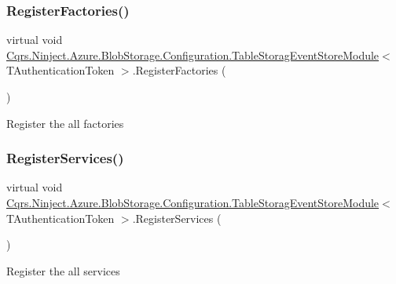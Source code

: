 \subsubsection{\texorpdfstring{Register\+Factories()}{RegisterFactories()}}
{\footnotesize\ttfamily virtual void \hyperlink{classCqrs_1_1Ninject_1_1Azure_1_1BlobStorage_1_1Configuration_1_1TableStoragEventStoreModule}{Cqrs.\+Ninject.\+Azure.\+Blob\+Storage.\+Configuration.\+Table\+Storag\+Event\+Store\+Module}$<$ T\+Authentication\+Token $>$.Register\+Factories (\begin{DoxyParamCaption}{ }\end{DoxyParamCaption})\hspace{0.3cm}{\ttfamily [virtual]}}



Register the all factories 

\mbox{\label{classCqrs_1_1Ninject_1_1Azure_1_1BlobStorage_1_1Configuration_1_1TableStoragEventStoreModule_aeeabe647aea332418ceee894e4cd2519}} 
\subsubsection{\texorpdfstring{Register\+Services()}{RegisterServices()}}
{\footnotesize\ttfamily virtual void \hyperlink{classCqrs_1_1Ninject_1_1Azure_1_1BlobStorage_1_1Configuration_1_1TableStoragEventStoreModule}{Cqrs.\+Ninject.\+Azure.\+Blob\+Storage.\+Configuration.\+Table\+Storag\+Event\+Store\+Module}$<$ T\+Authentication\+Token $>$.Register\+Services (\begin{DoxyParamCaption}{ }\end{DoxyParamCaption})\hspace{0.3cm}{\ttfamily [virtual]}}



Register the all services 

